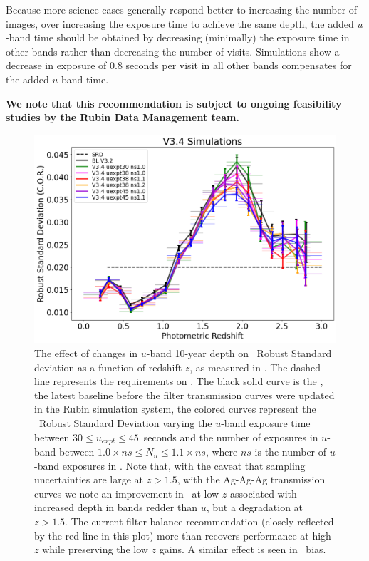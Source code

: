 Because more science cases generally respond better to increasing the number of images, over increasing the exposure time to achieve the same depth, the added $u$-band time should be obtained by decreasing (minimally) the exposure time in other bands rather than decreasing the number of visits. Simulations show a decrease in exposure of 0.8 seconds per visit in all other bands compensates for the added $u$-band time.

\textbf{ We note that this recommendation is subject to ongoing feasibility studies by the Rubin Data 
Management team.}

\begin{figure}
  \centering
 \includegraphics[height=0.6\textwidth]{figures/photo-z.png}

\caption{The effect of changes in $u$-band 10-year depth on \pz\ Robust Standard deviation as a function of redshift $z$, as measured in \cite{Graham_2017}. The dashed line represents the  requirements on \pz. The black solid curve is the , the latest baseline before the filter transmission curves were updated in the Rubin simulation system, the colored curves represent the \pz\ Robust Standard Deviation varying the  $u$-band exposure time between $30\leq u_{expt} \leq45$~seconds and the number of exposures in $u$-band between $1.0\times ns \leq N_u \leq 1.1\times ns$, where $ns$ is the number of $u$-band exposures in . Note that, with the caveat that sampling uncertainties are large at $z>1.5$, with the Ag-Ag-Ag transmission curves we note an improvement in \pz\ at low $z$ associated with increased depth in bands redder than $u$, but a degradation at $z>1.5$. The current filter balance recommendation (closely reflected by the red line in this plot) more than recovers performance at high $z$ while preserving the low $z$ gains. A similar effect is seen in \pz\ bias.}
\label{fig:pz}
\end{figure}

